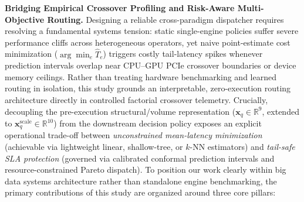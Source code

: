 \documentclass[10pt,a4paper]{article}
\begin{document}
\par\vspace{7pt plus 2pt minus 1pt}\noindent\textbf{Bridging Empirical Crossover Profiling and Risk-Aware Multi-Objective Routing.}
Designing a reliable cross-paradigm dispatcher requires resolving a fundamental systems tension: static single-engine policies suffer severe performance cliffs across heterogeneous operators, yet naive point-estimate cost minimization ($\arg\min_e \hat{T}_e$) triggers costly tail-latency spikes whenever prediction intervals overlap near CPU--GPU PCIe crossover boundaries or device memory ceilings. Rather than treating hardware benchmarking and learned routing in isolation, this study grounds an interpretable, zero-execution routing architecture directly in controlled factorial crossover telemetry. Crucially, decoupling the pre-execution structural/volume representation ($\mathbf{x}_q \in \mathbb{R}^9$, extended to $\mathbf{x}_q^{\text{scale}}\in\mathbb{R}^{10}$) from the downstream decision policy exposes an explicit operational trade-off between \emph{unconstrained mean-latency minimization} (achievable via lightweight linear, shallow-tree, or $k$-NN estimators) and \emph{tail-safe SLA protection} (governed via calibrated conformal prediction intervals and resource-constrained Pareto dispatch). To position our work clearly within big data systems architecture rather than standalone engine benchmarking, the primary contributions of this study are organized around three core pillars:
\end{document}
